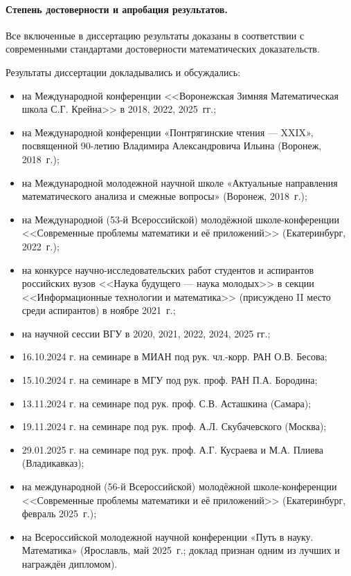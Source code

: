 \paragraph{Степень достоверности и апробация результатов.}

Все включенные в диссертацию результаты доказаны
в соответствии с современными стандартами достоверности математических доказательств.

Результаты диссертации докладывались и обсуждались:
\begin{itemize}
	\item
		на Международной конференции <<Воронежская Зимняя Математическая школа С.Г. Крейна>> в 2018, 2022, 2025~гг.;
	\item
		на Международной конференции «Понтрягинские чтения — XXIX», посвященной 90-летию Владимира Александровича Ильина (Воронеж, 2018~г.);
	\item
		на Международной молодежной научной школе «Актуальные направления математического анализа и смежные вопросы» (Воронеж, 2018~г.);
	\item
		на Международной (53-й Всероссийской) молодёжной школе-конференции
		<<Современные проблемы математики и её приложений>>
		(Екатеринбург, 2022~г.);
	\item
		на конкурсе научно-исследовательских работ студентов и аспирантов российских вузов
		<<Наука будущего --- наука молодых>> в секции <<Информационные технологии и математика>>
		(присуждено II место среди аспирантов) в ноябре 2021~г.;
	\item
		на научной сессии ВГУ в 2020, 2021, 2022, 2024, 2025 гг.; %
	\item
		16.10.2024 г. на семинаре в МИАН под рук. чл.-корр. РАН О.В. Бесова;
	\item
		15.10.2024 г. на семинаре в МГУ под рук. проф. РАН П.А. Бородина;
	\item
		13.11.2024 г. на семинаре под рук. проф. С.В. Асташкина (Самара);
	\item
		19.11.2024 г. на семинаре под рук. проф. А.Л. Скубачевского (Москва);
	\item
		29.01.2025 г. на семинаре под рук. проф. А.Г. Кусраева и М.А. Плиева (Владикавказ);
	\item
		на международной (56-й Всероссийской) молодёжной школе-конференции
		<<Современные проблемы математики и её приложений>>
		(Екатеринбург, февраль 2025~г.);
	\item
		на Всероссийской молодежной научной конференции «Путь в науку. Математика»
		(Ярославль, май 2025~г.; доклад признан одним из лучших и награждён дипломом).
\end{itemize}

